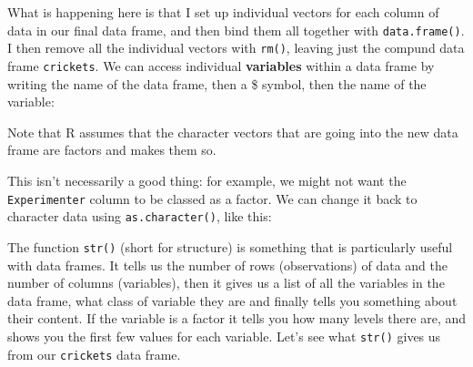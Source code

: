 \documentclass[
]{book}
\newenvironment{Shaded}{\begin{snugshade}}{\end{snugshade}}
\newcommand{\DecValTok}[1]{\textcolor[rgb]{0.00,0.00,0.81}{#1}}
\newcommand{\KeywordTok}[1]{\textcolor[rgb]{0.13,0.29,0.53}{\textbf{#1}}}
\newcommand{\NormalTok}[1]{#1}
\newcommand{\OperatorTok}[1]{\textcolor[rgb]{0.81,0.36,0.00}{\textbf{#1}}}
\newcommand{\OtherTok}[1]{\textcolor[rgb]{0.56,0.35,0.01}{#1}}
\newcommand{\StringTok}[1]{\textcolor[rgb]{0.31,0.60,0.02}{#1}}
\begin{document}
What is happening here is that I set up individual vectors for each column of data in our final data frame, and then bind them all together with \texttt{data.frame()}. I then remove all the individual vectors with \texttt{rm()}, leaving just the compund data frame \texttt{crickets}. We can access individual \textbf{variables} within a data frame by writing the name of the data frame, then a \$ symbol, then the name of the variable:

\begin{Shaded}
\end{Shaded}

Note that R assumes that the character vectors that are going into the new data frame are factors and makes them so.

\begin{Shaded}
\end{Shaded}

This isn't necessarily a good thing: for example, we might not want the \texttt{Experimenter} column to be classed as a factor. We can change it back to character data using \texttt{as.character()}, like this:

\begin{Shaded}
\end{Shaded}

The function \texttt{str()} (short for structure) is something that is particularly useful with data frames. It tells us the number of rows (observations) of data and the number of columns (variables), then it gives us a list of all the variables in the data frame, what class of variable they are and finally tells you something about their content. If the variable is a factor it tells you how many levels there are, and shows you the first few values for each variable. Let's see what \texttt{str()} gives us from our \texttt{crickets} data frame.
\end{document}
